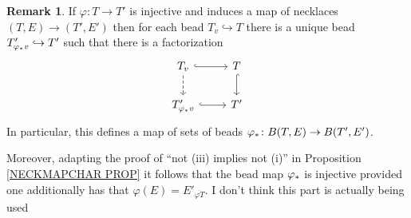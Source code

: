 \documentclass[a4paper,10pt
,draft
]{article}%
\numberwithin{equation}{section}
\numberwithin{figure}{section}
\theoremstyle{definition} %
\newtheorem{remark}[equation]{Remark}%
\newcommand{\1}{\ensuremath{\mathbbm 1}}%
\begin{document}
\begin{remark}\label{BEADMAP REM}
	If $\varphi \colon T \to T'$ is injective
	and induces a map of necklaces
	$(T,E) \to (T',E')$ then
	for each bead 
	$T_{v} \hookrightarrow T$
	there is a unique bead
	$T'_{\varphi_{\**} v} \hookrightarrow T'$
	such that there is a factorization	
	\begin{equation}
	\begin{tikzcd}
	T_v
	\ar[hookrightarrow]{r} 
	\ar[dashed]{d}
	&
	T
	\ar[hookrightarrow]{d}
	\\
	T'_{\varphi_{\**} v}
	\ar[hookrightarrow]{r}
	&
	T'
	\end{tikzcd}
	\end{equation}
	In particular, 
	this defines a map of sets of beads
	$\varphi_{\**} \colon 
	B(T,E) \to B(T',E')$.
	
	{\color{green} Moreover, adapting the proof of 
		``not (iii) implies not (i)''
		in Proposition \ref{NECKMAPCHAR PROP}
		it follows that the bead map
		$\varphi_{\**}$ is injective
		provided one additionally has that  
		$\varphi(E) = E'_{\overline{\varphi T}}$.}
	{\color{red} I don't think this part is actually being used}
\end{remark}
\end{document}
